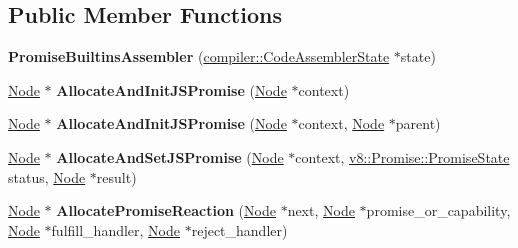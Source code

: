 \subsection*{Public Member Functions}
\begin{DoxyCompactItemize}
\item 
\mbox{\label{classv8_1_1internal_1_1PromiseBuiltinsAssembler_a6fd825775cf690998bb3dbc4e7491340}} 
{\bfseries Promise\+Builtins\+Assembler} (\mbox{\hyperlink{classv8_1_1internal_1_1compiler_1_1CodeAssemblerState}{compiler\+::\+Code\+Assembler\+State}} $\ast$state)
\item 
\mbox{\label{classv8_1_1internal_1_1PromiseBuiltinsAssembler_ad89892e58360295a4077269fedee4618}} 
\mbox{\hyperlink{classv8_1_1internal_1_1compiler_1_1Node}{Node}} $\ast$ {\bfseries Allocate\+And\+Init\+J\+S\+Promise} (\mbox{\hyperlink{classv8_1_1internal_1_1compiler_1_1Node}{Node}} $\ast$context)
\item 
\mbox{\label{classv8_1_1internal_1_1PromiseBuiltinsAssembler_a64cb6fe4c981d5984835994ea695942c}} 
\mbox{\hyperlink{classv8_1_1internal_1_1compiler_1_1Node}{Node}} $\ast$ {\bfseries Allocate\+And\+Init\+J\+S\+Promise} (\mbox{\hyperlink{classv8_1_1internal_1_1compiler_1_1Node}{Node}} $\ast$context, \mbox{\hyperlink{classv8_1_1internal_1_1compiler_1_1Node}{Node}} $\ast$parent)
\item 
\mbox{\label{classv8_1_1internal_1_1PromiseBuiltinsAssembler_a32a8f0a2e6c494144092b65821749cbe}} 
\mbox{\hyperlink{classv8_1_1internal_1_1compiler_1_1Node}{Node}} $\ast$ {\bfseries Allocate\+And\+Set\+J\+S\+Promise} (\mbox{\hyperlink{classv8_1_1internal_1_1compiler_1_1Node}{Node}} $\ast$context, \mbox{\hyperlink{classv8_1_1Promise_a0c357b9d99a634f98a5a203b0a322544}{v8\+::\+Promise\+::\+Promise\+State}} status, \mbox{\hyperlink{classv8_1_1internal_1_1compiler_1_1Node}{Node}} $\ast$result)
\item 
\mbox{\label{classv8_1_1internal_1_1PromiseBuiltinsAssembler_a16f1c2bc7dedebfe2cf76d564a5b9660}} 
\mbox{\hyperlink{classv8_1_1internal_1_1compiler_1_1Node}{Node}} $\ast$ {\bfseries Allocate\+Promise\+Reaction} (\mbox{\hyperlink{classv8_1_1internal_1_1compiler_1_1Node}{Node}} $\ast$next, \mbox{\hyperlink{classv8_1_1internal_1_1compiler_1_1Node}{Node}} $\ast$promise\+\_\+or\+\_\+capability, \mbox{\hyperlink{classv8_1_1internal_1_1compiler_1_1Node}{Node}} $\ast$fulfill\+\_\+handler, \mbox{\hyperlink{classv8_1_1internal_1_1compiler_1_1Node}{Node}} $\ast$reject\+\_\+handler)

\end{DoxyCompactItemize}
